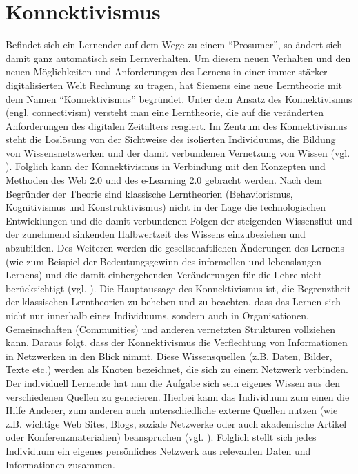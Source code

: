 \section{Konnektivismus}\label{section:konnektivismus}
Befindet sich ein Lernender auf dem Wege zu einem "`Prosumer"', so ändert sich damit ganz automatisch sein Lernverhalten. Um diesem neuen Verhalten und den neuen Möglichkeiten und Anforderungen des Lernens in einer immer stärker digitalisierten Welt Rechnung zu tragen, hat Siemens eine neue Lerntheorie mit dem Namen "`Konnektivismus"' begründet. Unter dem Ansatz des Konnektivismus (engl. connectivism) versteht man eine Lerntheorie, die auf die veränderten Anforderungen des digitalen Zeitalters reagiert. Im Zentrum des Konnektivismus steht die Loslösung von der Sichtweise des isolierten Individuums, die Bildung von Wissensnetzwerken und der damit verbundenen Vernetzung von Wissen (vgl. \cite{Siemens2004}). Folglich kann der Konnektivismus in Verbindung mit den Konzepten und Methoden des Web 2.0 und des e-Learning 2.0 gebracht werden.
Nach dem Begründer der Theorie sind klassische Lerntheorien (Behaviorismus, Kognitivismus und Konstruktivismus) nicht in der Lage die technologischen Entwicklungen und die damit verbundenen Folgen der steigenden Wissensflut und der zunehmend sinkenden Halbwertzeit des Wissens einzubeziehen und abzubilden. Des Weiteren werden die gesellschaftlichen Änderungen des Lernens (wie zum Beispiel der Bedeutungsgewinn des informellen und lebenslangen Lernens) und die damit einhergehenden Veränderungen für die Lehre nicht berücksichtigt (vgl. \cite{Siemens2004}).
Die Hauptaussage des Konnektivismus ist, die Begrenztheit der klassischen Lerntheorien zu beheben und zu beachten, dass das Lernen sich nicht nur innerhalb eines Individuums, sondern auch in Organisationen, Gemeinschaften (Communities) und anderen vernetzten Strukturen vollziehen kann. Daraus folgt, dass der Konnektivismus die Verflechtung von Informationen in Netzwerken in den Blick nimmt. Diese Wissensquellen (z.B. Daten, Bilder, Texte etc.) werden als Knoten bezeichnet, die sich zu einem Netzwerk verbinden. Der individuell Lernende hat nun die Aufgabe sich sein eigenes Wissen aus den verschiedenen Quellen zu generieren. Hierbei kann das Individuum zum einen die Hilfe Anderer, zum anderen auch unterschiedliche externe Quellen nutzen (wie z.B. wichtige Web Sites, Blogs, soziale Netzwerke oder auch akademische Artikel oder Konferenzmaterialien) beanspruchen (vgl. \cite{Siemens2004}). Folglich stellt sich jedes Individuum ein eigenes persönliches Netzwerk aus relevanten Daten und Informationen zusammen. 

